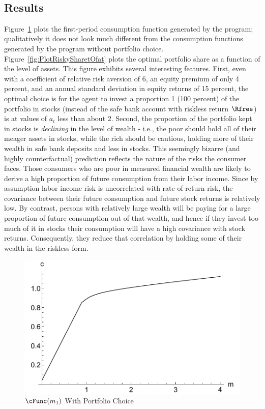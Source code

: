 \documentclass[titlepage]{\econtex}
\begin{document}
\
\subsection{Results}

Figure~\ref{fig:PlotctMultContr} plots the first-period consumption
function generated by the program; qualitatively it does not look much
different from the consumption functions generated by the program
without portfolio choice.  Figure~\ref{fig:PlotRiskySharetOfat} plots the
optimal portfolio share as a function of the level of assets.  This
figure exhibits several interesting features.  First, even with a
coefficient of relative risk aversion of 6, an equity premium of only
4 percent, and an annual standard deviation in equity returns of 15
percent, the optimal choice is for the agent
to invest a proportion 1 (100 percent) of the portfolio in stocks (instead of the safe bank account with riskless return $\Rfree$) is
at values of ${a}_{t}$ less than about 2.  Second, the
proportion of the portfolio kept in stocks is \textit{declining} in the
level of wealth - i.e., the poor should hold all of their meager
assets in stocks, while the rich should be cautious, holding more of
their wealth in safe bank deposits and less in stocks.  This
seemingly bizarre (and highly counterfactual) prediction reflects the
nature of the risks the consumer faces.  Those consumers who are poor
in measured financial wealth are likely to derive a high proportion of
future consumption from their labor income.  Since by assumption labor
income risk is uncorrelated with rate-of-return risk, the covariance
between their future consumption and future stock returns is
relatively low.  By contrast, persons with relatively large wealth
will be paying for a large proportion of future consumption out of that
wealth, and hence if they invest too much of it in stocks their consumption
will have a high covariance with stock returns.  Consequently, they
reduce that correlation by holding some of their wealth in the
riskless form.

\hypertarget{PlotctMultContr}{}
\begin{figure}
  \includegraphics{./Figures/PlotctMultContr}
  \caption{$\cFunc({m}_{1})$ With Portfolio Choice}
  \label{fig:PlotctMultContr}
\end{figure}
\end{document}
